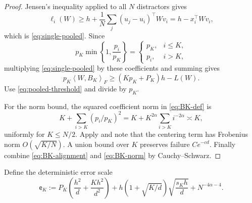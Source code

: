 \documentclass[11pt]{article}
\theoremstyle{definition}
\newcommand{\ip}[2]{\left\langle #1,#2\right\rangle_F}
\begin{document}
\begin{proof}
Jensen's inequality applied to all $N$ distractors gives
\[
 \ell_i(W)\geq h+\frac1N\sum_j(u_j-u_i)^\top Wv_i
 =h-x_i^\top Wv_i,
\]
which is \eqref{eq:single-pooled}.  Since
\[
 p_K\min\left\{1,\frac{p_i}{p_K}\right\}
 =\begin{cases}p_K,&i\leq K,\\ p_i,&i>K,\end{cases}
\]
multiplying \eqref{eq:single-pooled} by these coefficients and summing
gives
\[
 p_K\ip{W}{B_K}
 \geq(Kp_K+P_K)h-L(W).
\]
Use \eqref{eq:pooled-threshold} and divide by $p_K$.

For the norm bound, the squared coefficient norm in \eqref{eq:BK-def}
is
\[
 K+\sum_{i>K}(p_i/p_K)^2
 =K+K^{2\alpha}\sum_{i>K}i^{-2\alpha}\asymp K,
\]
uniformly for $K\leq N/2$.  Apply  and note that
the centering term has Frobenius norm $O(\sqrt{K/N})$.  A union bound
over $K$ preserves failure $Ce^{-cd}$.  Finally combine
\eqref{eq:BK-alignment} and \eqref{eq:BK-norm} by Cauchy--Schwarz.
\end{proof}

Define the deterministic error scale
\begin{equation}
 \mathsf e_K:=
 P_K\left(\frac{h^2}{d}+\frac{Kh^2}{d^2}\right)
 +h\left(1+\sqrt{K/d}\right)\sqrt{\frac{s_Kh}{d}}
 +N^{-4\alpha-4}.
 \label{eq:head-error}
\end{equation}
\end{document}
